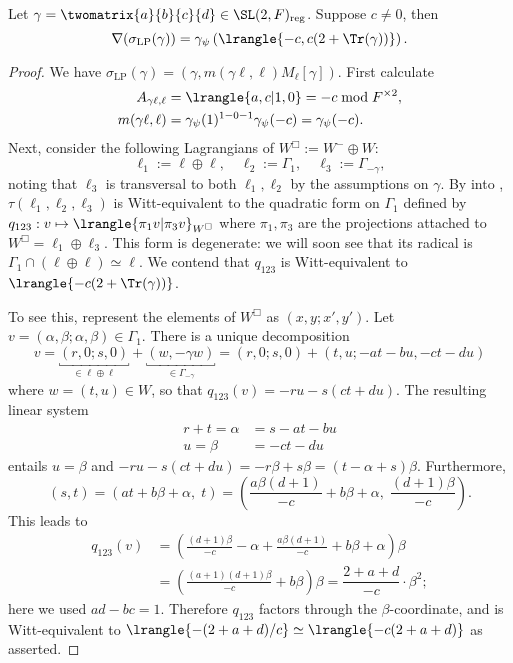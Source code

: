 \documentclass[a4paper,10pt]{article}
\begin{document}
\begin{lemma}\label{prop:nabla-1}
	Let $\gamma = \twomatrix{a}{b}{c}{d} \in \SL(2,F)_{\mathrm{reg}}$. Suppose $c \neq 0$, then
	\[ \nabla(\sigma_{\mathrm{LP}}(\gamma))  = \gamma_\psi\left( \lrangle{-c, c(2 + \Tr(\gamma))} \right). \]
\end{lemma}
\begin{proof}
	We have $\sigma_\text{LP}(\gamma) = (\gamma, m(\gamma\ell, \ell) M_\ell[\gamma])$. First calculate
	\begin{equation}\label{eqn:cal-m} \begin{aligned}
		A_{\gamma\ell, \ell} & = \lrangle{ a,c | 1,0 } = -c \bmod F^{\times 2}, \\
		m(\gamma\ell, \ell) & = \gamma_\psi(1)^{1-0-1} \gamma_\psi(-c) = \gamma_\psi(-c).
	\end{aligned}\end{equation}
	Next, consider the following Lagrangians of $W^\Box := W^- \oplus W$:
	\[ \ell_1 := \ell \oplus \ell, \quad \ell_2 := \Gamma_1, \quad \ell_3 := \Gamma_{-\gamma}, \]
	noting that $\ell_3$ is transversal to both $\ell_1, \ell_2$ by the assumptions on $\gamma$. By  into \cite[Lemme 1.4.2]{Per81}, $\tau(\ell_1, \ell_2, \ell_3)$ is Witt-equivalent to the quadratic form on $\Gamma_1$ defined by $q_{123}: v \mapsto \lrangle{\pi_1 v | \pi_3 v}_{W^\Box}$ where $\pi_1, \pi_3$ are the projections attached to $W^\Box = \ell_1 \oplus \ell_3$. This form is degenerate: we will soon see that its radical is $\Gamma_1 \cap (\ell \oplus \ell) \simeq \ell$. We contend that $q_{123}$ is Witt-equivalent to $\lrangle{ -c(2 + \Tr(\gamma)) }$.
	
	To see this, represent the elements of $W^\Box$ as $(x,y;x',y')$. Let $v = (\alpha,\beta; \alpha, \beta) \in \Gamma_1$. There is a unique decomposition
	\[ v = \underbracket{(r, 0; s, 0)}_{\in \ell \oplus \ell} + \underbracket{(w, -\gamma w)}_{\in \Gamma_{-\gamma}} = (r, 0; s, 0) + \left( t, u; -at-bu, -ct-du \right) \]
	where $w = (t,u) \in W$, so that $q_{123}(v) = -ru - s(ct+du)$. The resulting linear system
	\begin{align*}
		r + t = \alpha & = s - at - bu \\
		u = \beta & = -ct - du
	\end{align*}
	entails $u=\beta$ and $-ru - s(ct+du) = -r\beta + s\beta = (t-\alpha+s)\beta$. Furthermore,
	\[ (s, t) = (a t + b\beta + \alpha, \; t) = \left( \frac{a\beta(d+1)}{-c} + b\beta + \alpha, \; \frac{(d+1)\beta}{-c} \right). \]
	This leads to
	\begin{align*}
		q_{123}(v) & = \left( \frac{(d+1)\beta}{-c} - \alpha + \frac{a\beta(d+1)}{-c} + b\beta + \alpha \right) \beta \\
		& = \left( \frac{(a+1)(d+1)\beta}{-c} + b\beta \right) \beta = \dfrac{2 + a + d}{-c} \cdot \beta^2;
	\end{align*}
	here we used $ad-bc=1$. Therefore $q_{123}$ factors through the $\beta$-coordinate, and is Witt-equivalent to $\lrangle{-(2+a+d)/c} \simeq \lrangle{-c(2+a+d)}$ as asserted.
	

\end{proof}
\end{document}
